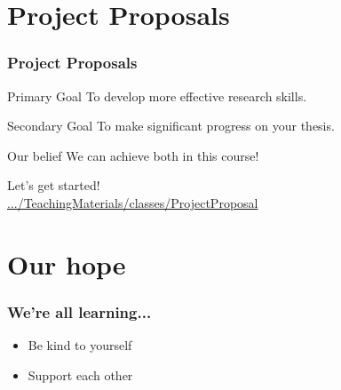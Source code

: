 \documentclass{beamer}
\begin{document}

\section{Project Proposals}


\begin{frame}
    \frametitle{Project Proposals}

    \begin{block}{Primary Goal}
        To develop more effective research skills.
    \end{block}

    \begin{block}{Secondary Goal}
        To make significant progress on your thesis.
    \end{block}

    \begin{block}{Our belief}
        We can achieve both in this course!
    \end{block}

Let's get started!\\
        \href{https://github.com/analyticalworkflows/TeachingMaterials/tree/master/classes/ProjectProposal}{.../TeachingMaterials/classes/ProjectProposal}


\end{frame}


\section{Our hope}


\begin{frame}
    \frametitle{We're all learning...}



    \begin{itemize}
        \item Be kind to yourself
        \item Support each other
    \end{itemize}

	\bigskip


\end{frame}
\end{document}
